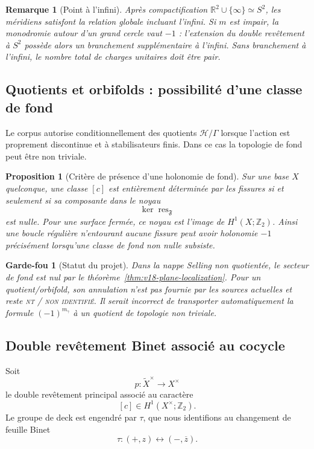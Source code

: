 \documentclass[11pt,a4paper]{article}
\newtheorem{proposition}[theorem]{Proposition}
\newtheorem{remark}[theorem]{Remarque}
\newtheorem{guardrail}[theorem]{Garde-fou}
\newcommand{\statusNT}{\textsc{nt / non identifié}}
\begin{document}
\begin{remark}[Point à l'infini]
Après compactification $\mathbb R^2\cup\{\infty\}\simeq S^2$, les méridiens satisfont la relation globale incluant l'infini. Si $m$ est impair, la monodromie autour d'un grand cercle vaut $-1$ : l'extension du double revêtement à $S^2$ possède alors un branchement supplémentaire à l'infini. Sans branchement à l'infini, le nombre total de charges unitaires doit être pair.
\end{remark}

\subsection{Quotients et orbifolds : possibilité d'une classe de fond}

Le corpus autorise conditionnellement des quotients $\mathcal H/\Gamma$ lorsque l'action est proprement discontinue et à stabilisateurs finis. Dans ce cas la topologie de fond peut être non triviale.

\begin{proposition}[Critère de présence d'une holonomie de fond]\label{prop:v18-background}
Sur une base $X$ quelconque, une classe $[c]$ est entièrement déterminée par les fissures si et seulement si sa composante dans le noyau
\[
 \ker\operatorname{res}_{\mathfrak F}
\]
est nulle. Pour une surface fermée, ce noyau est l'image de $H^1(X;\mathbb Z_2)$. Ainsi une boucle régulière n'entourant aucune fissure peut avoir holonomie $-1$ précisément lorsqu'une classe de fond non nulle subsiste.
\end{proposition}

\begin{guardrail}[Statut du projet]
Dans la nappe Selling non quotientée, le secteur de fond est nul par le théorème~\ref{thm:v18-plane-localization}. Pour un quotient/orbifold, son annulation n'est pas fournie par les sources actuelles et reste \statusNT{}. Il serait incorrect de transporter automatiquement la formule $(-1)^{m_\gamma}$ à un quotient de topologie non triviale.
\end{guardrail}

\subsection{Double revêtement Binet associé au cocycle}

Soit
\[
 p:\widetilde X^\times\longrightarrow X^\times
\]
le double revêtement principal associé au caractère
\[
 [c]\in H^1(X^\times;\mathbb Z_2).
\]
Le groupe de deck est engendré par $\tau$, que nous identifions au changement de feuille Binet
\[
 \tau:(+,z)\longleftrightarrow(-,\overline z).
\]
\end{document}
